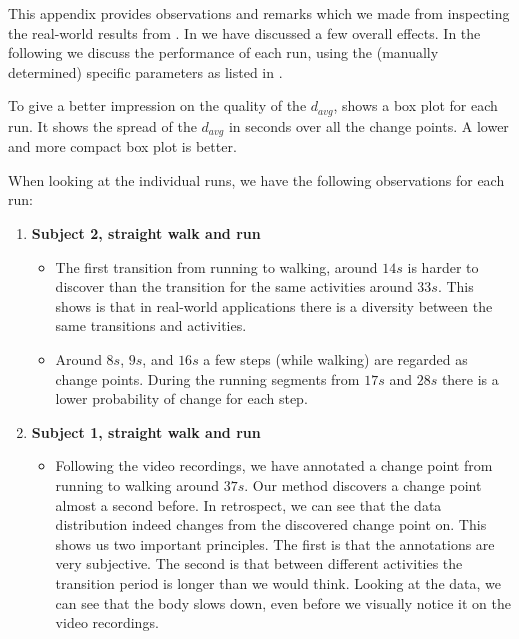This appendix provides observations and remarks which we made from inspecting the real-world results from .
In  we have discussed a few overall effects.
In the following we discuss the performance of each run, using the (manually determined) specific parameters as listed in .

To give a better impression on the quality of the $d_{avg}$,  shows a box plot for each run.
It shows the spread of the $d_{avg}$ in seconds over all the change points.
A lower and more compact box plot is better.

When looking at the individual runs, we have the following observations for each run:

\begin{enumerate}
  \item \textbf{Subject 2, straight walk and run} 
    \begin{itemize}
      \item The first transition from running to walking, around $14s$ is harder to discover than the transition for the same activities around $33s$.
      This shows is that in real-world applications there is a diversity between the same transitions and activities.
      \item Around $8s$, $9s$, and $16s$ a few steps (while walking) are regarded as change points.
      During the running segments from $17s$ and $28s$ there is a lower probability of change for each step.
    \end{itemize}
  \item \textbf{Subject 1, straight walk and run} 
    \begin{itemize}
      \item Following the video recordings, we have annotated a change point from running to walking around $37s$.
      Our method discovers a change point almost a second before.
      In retrospect, we can see that the data distribution indeed changes from the discovered change point on.
      This shows us two important principles.
      The first is that the annotations are very subjective.
      The second is that between different activities the transition period is longer than we would think.
      Looking at the data, we can see that the body slows down, even before we visually notice it on the video recordings.
    \end{itemize}


\end{enumerate}
